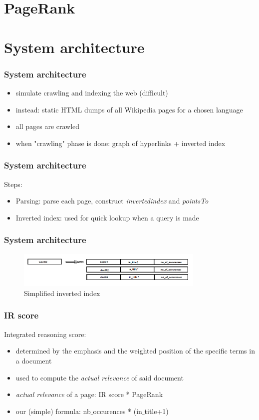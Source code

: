 \documentclass[9pt]{beamer}
\begin{document}
\section{PageRank}


\section{System architecture}


\begin{frame}
\frametitle{System architecture}

\begin{itemize}
\item simulate crawling and indexing the web (difficult)
\item instead: static HTML dumps of all Wikipedia pages for a chosen language
\item all pages are crawled
\item when "crawling" phase is done: graph of hyperlinks + inverted index
\end{itemize}
\end{frame}

\begin{frame}
\frametitle{System architecture}

Steps:

\begin{itemize}
\item Parsing: parse each page, construct \emph{invertedindex} and \emph{pointsTo}
\item Inverted index: used for quick lookup when a query is made
\end{itemize}
\end{frame}

\begin{frame}
\frametitle{System architecture}
\begin{figure}[h]
\includegraphics[width=0.8\textwidth]{index.png}
\caption{Simplified inverted index}
\end{figure}
\end{frame}


\begin{frame}
\frametitle{IR score}
Integrated reasoning score:

\begin{itemize}
\item determined by the emphasis and the weighted position of the specific terms in a document
\item used to compute the \emph{actual relevance}  of said document
\item \emph{actual relevance} of a page: IR score * PageRank
\item our (simple) formula: nb$\_$occurences * (in$\_$title+1)
\end{itemize}
\end{frame}
\end{document}
